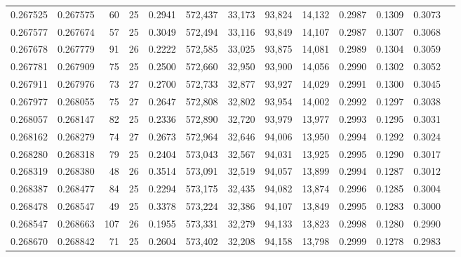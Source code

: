 \begin{tabular}{rrrrrrrrrrrrr}
0.267525 & 0.267575 &  60 &  25 &                                     0.2941 & 572,437 &  33,173 &  93,824 &  14,132 & 0.2987 & 0.1309 & 0.3073 \\
0.267577 & 0.267674 &  57 &  25 &                                     0.3049 & 572,494 &  33,116 &  93,849 &  14,107 & 0.2987 & 0.1307 & 0.3068 \\
0.267678 & 0.267779 &  91 &  26 &                                     0.2222 & 572,585 &  33,025 &  93,875 &  14,081 & 0.2989 & 0.1304 & 0.3059 \\
0.267781 & 0.267909 &  75 &  25 &                                     0.2500 & 572,660 &  32,950 &  93,900 &  14,056 & 0.2990 & 0.1302 & 0.3052 \\
0.267911 & 0.267976 &  73 &  27 &                                     0.2700 & 572,733 &  32,877 &  93,927 &  14,029 & 0.2991 & 0.1300 & 0.3045 \\
0.267977 & 0.268055 &  75 &  27 &                                     0.2647 & 572,808 &  32,802 &  93,954 &  14,002 & 0.2992 & 0.1297 & 0.3038 \\
0.268057 & 0.268147 &  82 &  25 &                                     0.2336 & 572,890 &  32,720 &  93,979 &  13,977 & 0.2993 & 0.1295 & 0.3031 \\
0.268162 & 0.268279 &  74 &  27 &                                     0.2673 & 572,964 &  32,646 &  94,006 &  13,950 & 0.2994 & 0.1292 & 0.3024 \\
0.268280 & 0.268318 &  79 &  25 &                                     0.2404 & 573,043 &  32,567 &  94,031 &  13,925 & 0.2995 & 0.1290 & 0.3017 \\
0.268319 & 0.268380 &  48 &  26 &                                     0.3514 & 573,091 &  32,519 &  94,057 &  13,899 & 0.2994 & 0.1287 & 0.3012 \\
0.268387 & 0.268477 &  84 &  25 &                                     0.2294 & 573,175 &  32,435 &  94,082 &  13,874 & 0.2996 & 0.1285 & 0.3004 \\
0.268478 & 0.268547 &  49 &  25 &                                     0.3378 & 573,224 &  32,386 &  94,107 &  13,849 & 0.2995 & 0.1283 & 0.3000 \\
0.268547 & 0.268663 & 107 &  26 &                                     0.1955 & 573,331 &  32,279 &  94,133 &  13,823 & 0.2998 & 0.1280 & 0.2990 \\
0.268670 & 0.268842 &  71 &  25 &                                     0.2604 & 573,402 &  32,208 &  94,158 &  13,798 & 0.2999 & 0.1278 & 0.2983 \\

\end{tabular}
